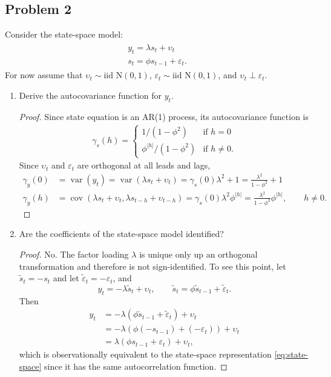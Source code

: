 \documentclass[oneside,reqno]{amsart}
\DeclareMathOperator{\var}{var}
\DeclareMathOperator{\cov}{cov}
\newcommand{\eps}{\varepsilon}
\newcommand{\ups}{\upsilon}
\newcommand{\N}{\mathrm N}
\theoremstyle{definition}
\begin{document}
\subsection*{Problem 2}
Consider the state-space model:
\begin{align}\label{eq:state-space}
\begin{split}
	y_t = \lambda s_t + \ups_t   \\
	s_t = \phi s_{t-1} + \eps_t.
\end{split}
\end{align}
For now assume that $\ups_t \sim \text{iid }\N(0,1)$, $\eps_t \sim \text{iid }\N(0,1)$, and $\ups_t \perp\eps_t$.
\begin{enumerate}
\item
Derive the autocovariance function for $y_t$.

\begin{proof}
Since state equation is an AR(1) process, its autocovariance function is
\begin{align*}
	\gamma_s(h)  = \begin{cases}
		1/(1-\phi^2) & \text{if } h = 0 \\
		\phi^{|h|}/(1-\phi^2) & \text{if } h \neq 0.				
	\end{cases}
\end{align*}
Since $\ups_t$ and $\eps_t$ are orthogonal at all leads and lags, 
\begin{align*}
	\gamma_y(0) &= \var(y_t) = \var(\lambda s_t + \ups_t) 
		= \gamma_s(0)\lambda^2 + 1 
		= \frac{\lambda^2}{1-\phi^2} + 1 \\
	\gamma_y(h) &= \cov(\lambda s_t + \ups_t, \lambda s_{t-h} + \ups_{t-h}) 
		= \gamma_s(0) \lambda^2 \phi^{|h|} = \frac{\lambda^2}{1-\phi^2} \phi^{|h|}, \qquad h \neq 0.
\end{align*}
\end{proof}

\item
Are the coefficients of the state-space model identified?

\begin{proof}
No. The factor loading $\lambda$ is unique only up an orthogonal transformation and therefore is not sign-identified. To see this point, let $\tilde s_t = -s_t$ and let $\tilde\eps_t = -\eps_t$, and 
\[
	y_t = -\lambda \tilde s_t + \ups_t, \qquad \tilde s_t = \phi \tilde s_{t-1} + \tilde\eps_t.
\]
Then 
\begin{align*}
	y_t &= -\lambda (\phi \tilde s_{t-1} + \tilde\eps_t) + \ups_t \\
	&= -\lambda (\phi (- s_{t-1}) + (-\eps_t)) + \ups_t \\
	&= \lambda (\phi s_{t-1}  + \eps_t) + \ups_t,
\end{align*}
which is observationally equivalent to the state-space representation \eqref{eq:state-space} since it has the same autocorrelation function.
\end{proof}


\end{enumerate}
\end{document}
